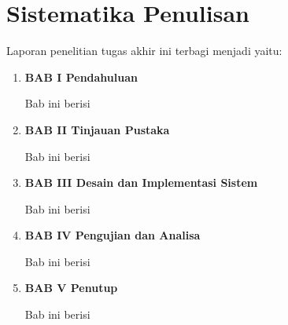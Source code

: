 \section{Sistematika Penulisan}
\label{sec:sistematikapenulisan}

Laporan penelitian tugas akhir ini terbagi menjadi \lipsum[1][1-3] yaitu:

\begin{enumerate}[nolistsep]

  \item \textbf{BAB I Pendahuluan}

        Bab ini berisi \lipsum[2][1-5]

        \vspace{2ex}

  \item \textbf{BAB II Tinjauan Pustaka}

        Bab ini berisi \lipsum[3][1-5]

        \vspace{2ex}

  \item \textbf{BAB III Desain dan Implementasi Sistem}

        Bab ini berisi \lipsum[4][1-5]

        \vspace{2ex}

  \item \textbf{BAB IV Pengujian dan Analisa}

        Bab ini berisi \lipsum[5][1-5]

        \vspace{2ex}

  \item \textbf{BAB V Penutup}

        Bab ini berisi \lipsum[6][1-5]

\end{enumerate}
